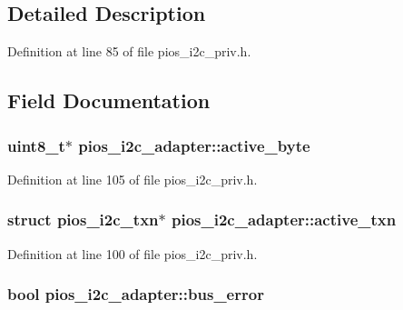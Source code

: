 \subsection{\-Detailed \-Description}


\-Definition at line 85 of file pios\-\_\-i2c\-\_\-priv.\-h.



\subsection{\-Field \-Documentation}
\hypertarget{structpios__i2c__adapter_a841cb6403bc7fc1cde74b36755789d03}{
\subsubsection[{active\-\_\-byte}]{\setlength{\rightskip}{0pt plus 5cm}uint8\-\_\-t$\ast$ {\bf pios\-\_\-i2c\-\_\-adapter\-::active\-\_\-byte}}}\label{structpios__i2c__adapter_a841cb6403bc7fc1cde74b36755789d03}


\-Definition at line 105 of file pios\-\_\-i2c\-\_\-priv.\-h.

\hypertarget{structpios__i2c__adapter_a9f7ec0aa23437d00ceade3b67625eec6}{
\subsubsection[{active\-\_\-txn}]{\setlength{\rightskip}{0pt plus 5cm}struct {\bf pios\-\_\-i2c\-\_\-txn}$\ast$ {\bf pios\-\_\-i2c\-\_\-adapter\-::active\-\_\-txn}}}\label{structpios__i2c__adapter_a9f7ec0aa23437d00ceade3b67625eec6}


\-Definition at line 100 of file pios\-\_\-i2c\-\_\-priv.\-h.

\hypertarget{structpios__i2c__adapter_a98b74dc40da65289c18494530b759724}{
\subsubsection[{bus\-\_\-error}]{\setlength{\rightskip}{0pt plus 5cm}bool {\bf pios\-\_\-i2c\-\_\-adapter\-::bus\-\_\-error}}}\label{structpios__i2c__adapter_a98b74dc40da65289c18494530b759724}



